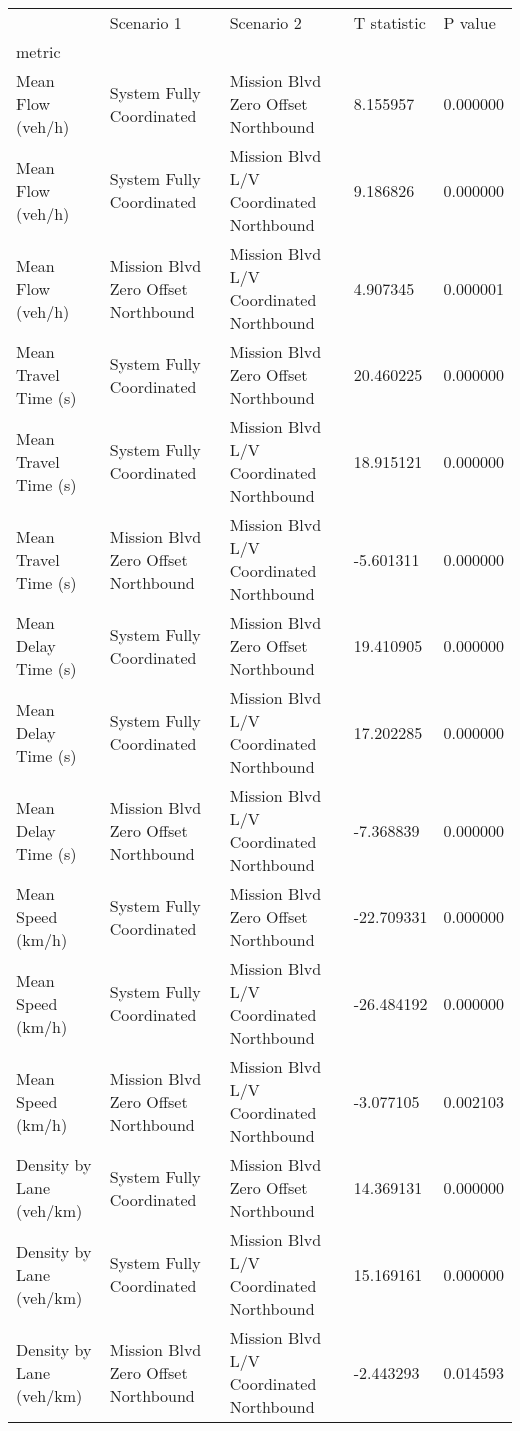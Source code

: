 \begin{tabular}{lllll}
\toprule
 & Scenario 1 & Scenario 2 & T statistic & P value \\
metric &  &  &  &  \\
\midrule
Mean Flow (veh/h) & System Fully Coordinated & Mission Blvd Zero Offset Northbound & 8.155957 & 0.000000 \\
Mean Flow (veh/h) & System Fully Coordinated & Mission Blvd L/V Coordinated Northbound & 9.186826 & 0.000000 \\
Mean Flow (veh/h) & Mission Blvd Zero Offset Northbound & Mission Blvd L/V Coordinated Northbound & 4.907345 & 0.000001 \\
Mean Travel Time (s) & System Fully Coordinated & Mission Blvd Zero Offset Northbound & 20.460225 & 0.000000 \\
Mean Travel Time (s) & System Fully Coordinated & Mission Blvd L/V Coordinated Northbound & 18.915121 & 0.000000 \\
Mean Travel Time (s) & Mission Blvd Zero Offset Northbound & Mission Blvd L/V Coordinated Northbound & -5.601311 & 0.000000 \\
Mean Delay Time (s) & System Fully Coordinated & Mission Blvd Zero Offset Northbound & 19.410905 & 0.000000 \\
Mean Delay Time (s) & System Fully Coordinated & Mission Blvd L/V Coordinated Northbound & 17.202285 & 0.000000 \\
Mean Delay Time (s) & Mission Blvd Zero Offset Northbound & Mission Blvd L/V Coordinated Northbound & -7.368839 & 0.000000 \\
Mean Speed (km/h) & System Fully Coordinated & Mission Blvd Zero Offset Northbound & -22.709331 & 0.000000 \\
Mean Speed (km/h) & System Fully Coordinated & Mission Blvd L/V Coordinated Northbound & -26.484192 & 0.000000 \\
Mean Speed (km/h) & Mission Blvd Zero Offset Northbound & Mission Blvd L/V Coordinated Northbound & -3.077105 & 0.002103 \\
Density by Lane (veh/km) & System Fully Coordinated & Mission Blvd Zero Offset Northbound & 14.369131 & 0.000000 \\
Density by Lane (veh/km) & System Fully Coordinated & Mission Blvd L/V Coordinated Northbound & 15.169161 & 0.000000 \\
Density by Lane (veh/km) & Mission Blvd Zero Offset Northbound & Mission Blvd L/V Coordinated Northbound & -2.443293 & 0.014593 \\

\end{tabular}

